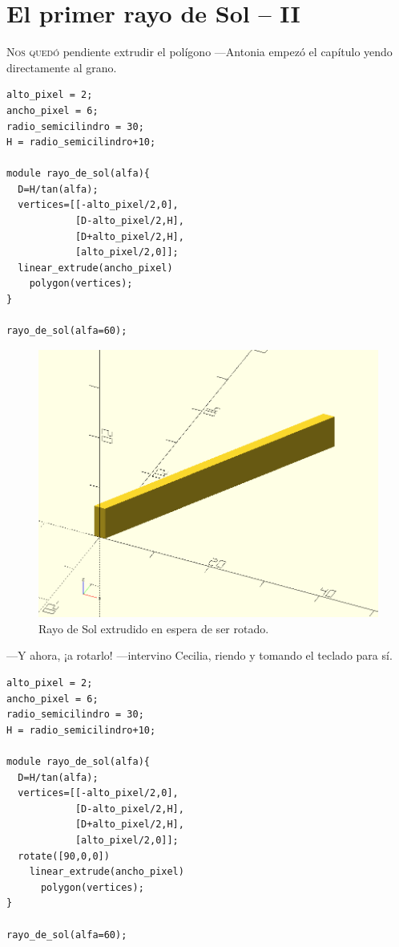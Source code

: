 
\chapter{El primer rayo de Sol -- II}
\label{sec:el-primer-rayo-de-sol-ii}

\lettrine[ante=\raisebox{-1.5ex}{\Large ---},lines=2]{N}{os quedó}
pendiente extrudir el polígono ---An\-to\-nia empezó el capítulo yendo
directamente al grano.

    \begin{center}
    \begin{lstlisting}
alto_pixel = 2;
ancho_pixel = 6;
radio_semicilindro = 30;
H = radio_semicilindro+10;

module rayo_de_sol(alfa){
  D=H/tan(alfa);
  vertices=[[-alto_pixel/2,0],
            [D-alto_pixel/2,H],
            [D+alto_pixel/2,H],
            [alto_pixel/2,0]];
  linear_extrude(ancho_pixel)
    polygon(vertices);
}
 
rayo_de_sol(alfa=60);
    \end{lstlisting}
  \end{center}

  \begin{figure}[t]
    \centering
  \includegraphics[width=.6\textwidth]{imagenes/rayo-extrudido-1}  
  \caption{Rayo de Sol extrudido en espera de ser rotado.}
    \label{fig:rayo-extrudido-1}
  \end{figure}
  
  

  ---Y ahora, ¡a rotarlo! ---intervino Cecilia, riendo y tomando el
  teclado para sí.

    \begin{lstlisting}
alto_pixel = 2;
ancho_pixel = 6;
radio_semicilindro = 30;
H = radio_semicilindro+10;

module rayo_de_sol(alfa){
  D=H/tan(alfa);
  vertices=[[-alto_pixel/2,0],
            [D-alto_pixel/2,H],
            [D+alto_pixel/2,H],
            [alto_pixel/2,0]];
  rotate([90,0,0])
    linear_extrude(ancho_pixel)
      polygon(vertices);
}
 
rayo_de_sol(alfa=60);
    \end{lstlisting}

